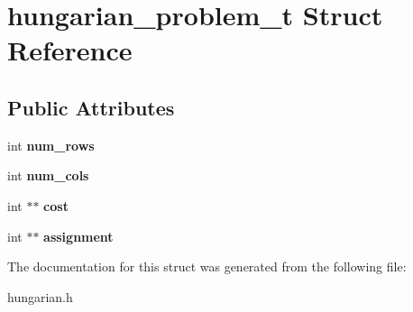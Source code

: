 \hypertarget{structhungarian__problem__t}{\section{hungarian\-\_\-problem\-\_\-t Struct Reference}
\label{structhungarian__problem__t}
}
\subsection*{Public Attributes}
\begin{DoxyCompactItemize}
\item 
\hypertarget{structhungarian__problem__t_a3c2bac3b3d4de12a090a0cfdd892174b}{int {\bfseries num\-\_\-rows}}\label{structhungarian__problem__t_a3c2bac3b3d4de12a090a0cfdd892174b}

\item 
\hypertarget{structhungarian__problem__t_a1ce62cd1cbb95d979323d0e1e382d085}{int {\bfseries num\-\_\-cols}}\label{structhungarian__problem__t_a1ce62cd1cbb95d979323d0e1e382d085}

\item 
\hypertarget{structhungarian__problem__t_af67d500d06a1665e0607c69efb17d852}{int $\ast$$\ast$ {\bfseries cost}}\label{structhungarian__problem__t_af67d500d06a1665e0607c69efb17d852}

\item 
\hypertarget{structhungarian__problem__t_a88dc1f9639c84c7631e3f7e001b2b9b3}{int $\ast$$\ast$ {\bfseries assignment}}\label{structhungarian__problem__t_a88dc1f9639c84c7631e3f7e001b2b9b3}

\end{DoxyCompactItemize}


The documentation for this struct was generated from the following file\-:\begin{DoxyCompactItemize}
\item 
hungarian.\-h\end{DoxyCompactItemize}
